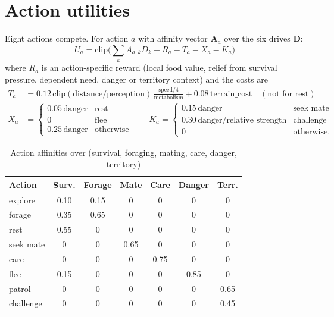 \section{Action utilities}
Eight actions compete. For action $a$ with affinity vector $\mathbf{A}_a$ over the
six drives $\mathbf{D}$:
\[
U_a=\mathrm{clip}\Big(\textstyle\sum_k A_{a,k}D_k+R_a-T_a-X_a-K_a\Big)
\]
where $R_a$ is an action-specific reward (local food value, relief from survival
pressure, dependent need, danger or territory context) and the costs are
\begin{align*}
T_a&=0.12\,\mathrm{clip}(\text{distance}/\text{perception})\,\frac{\text{speed}/4}{\text{metabolism}}+0.08\,\text{terrain\_cost}\quad(\text{not for rest})\\
X_a&=\begin{cases}0.05\,\text{danger}&\text{rest}\\0&\text{flee}\\0.25\,\text{danger}&\text{otherwise}\end{cases}\qquad
K_a=\begin{cases}0.15\,\text{danger}&\text{seek mate}\\0.30\,\text{danger}/\text{relative strength}&\text{challenge}\\0&\text{otherwise.}\end{cases}
\end{align*}

\begin{table}[htbp]
\centering
\caption{Action affinities over (survival, foraging, mating, care, danger, territory)}
\begin{tabular}{lcccccc}
\toprule
Action & Surv. & Forage & Mate & Care & Danger & Terr. \\
\midrule
explore & 0.10 & 0.15 & 0 & 0 & 0 & 0 \\
forage & 0.35 & 0.65 & 0 & 0 & 0 & 0 \\
rest & 0.55 & 0 & 0 & 0 & 0 & 0 \\
seek mate & 0 & 0 & 0.65 & 0 & 0 & 0 \\
care & 0 & 0 & 0 & 0.75 & 0 & 0 \\
flee & 0.15 & 0 & 0 & 0 & 0.85 & 0 \\
patrol & 0 & 0 & 0 & 0 & 0 & 0.65 \\
challenge & 0 & 0 & 0 & 0 & 0 & 0.45 \\
\bottomrule
\end{tabular}
\end{table}


